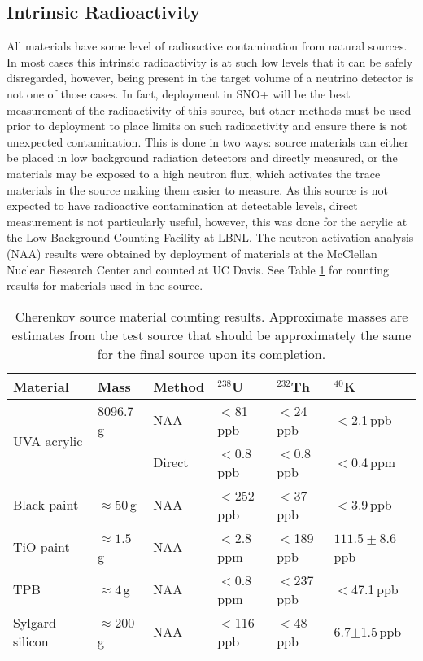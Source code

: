 \subsection{Intrinsic Radioactivity}
\label{sec:matcounting}
All materials have some level of radioactive contamination from natural sources.
In most cases this intrinsic radioactivity is at such low levels that it can be safely disregarded, however, being present in the target volume of a neutrino detector is not one of those cases.
In fact, deployment in SNO+ will be the best measurement of the radioactivity of this source, but other methods must be used prior to deployment to place limits on such radioactivity and ensure there is not unexpected contamination.
This is done in two ways: source materials can either be placed in low background radiation detectors and directly measured, or the materials may be exposed to a high neutron flux, which activates the trace materials in the source making them easier to measure.
As this source is not expected to have radioactive contamination at detectable levels, direct measurement is not particularly useful, however, this was done for the acrylic at the Low Background Counting Facility at LBNL.
The neutron activation analysis (NAA) results were obtained by deployment of materials at the McClellan Nuclear Research Center and counted at UC Davis. 
See Table \ref{tab:counting} for counting results for materials used in the source.

\begin{table}[h!]
\centering
\begin{tabular}{|l|l|l|l|l|l|} \hline
                    Material       & Mass & Method    & $^{238}$U     & $^{232}$Th    & $^{40}$K      \\ \hline
 \multirow{2}{*}{UVA acrylic}  & 8096.7\,g & NAA    & $<$81\,ppb    & $<$24\,ppb   & $<$2.1\,ppb   \\ \cline{3-6}
                                   & & Direct & $<$0.8\,ppb &$<$0.8\,ppb & $<$0.4\,ppm \\ \hline
                    Black paint    & $\approx 50$\,g & NAA    & $<$252\,ppb   & $<$37\,ppb   & $<$3.9\,ppb           \\ \hline
                    TiO paint      & $\approx 1.5$\,g & NAA    & $<$2.8\,ppm   & $<$189\,ppb  & $111.5 \pm 8.6$\,ppb           \\ \hline
                    TPB            & $\approx 4$\,g & NAA    & $<$0.8\,ppm   & $<$237\,ppb   & $<$47.1\,ppb  \\ \hline
                    Sylgard silicon& $\approx 200$\,g & NAA    & $<$116\,ppb   & $<$48\,ppb   &6.7$\pm$1.5\,ppb\\ \hline
\end{tabular}
\caption{\label{tab:counting} Cherenkov source material counting results. Approximate masses are estimates from the test source that should be approximately the same for the final source upon its completion.}
\end{table}


